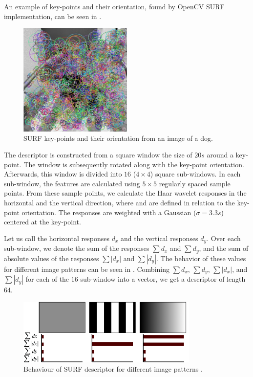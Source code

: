 An example of key-points and their orientation, found by OpenCV SURF implementation, can be seen in .
\begin{figure}[ht!]
    \centering
    \includegraphics[width=0.50\textwidth]{Figures/surf/surf_example.jpg}
    \caption[SURF key-points and their orientation from an image of a dog]{SURF key-points and their orientation from an image of a dog.}
    \label{fig:surf_example}
\end{figure}

The descriptor is constructed from a square window the size of $20s$ around a key-point. The window is subsequently rotated along with the key-point orientation. Afterwards, this window is divided into $16$ ($4\times4$) square sub-windows. In each sub-window, the features are calculated using $5\times5$ regularly spaced sample points. From these sample points, we calculate the Haar wavelet responses in the horizontal and the vertical direction, where  and  are defined in relation to the key-point orientation. The responses are weighted with a Gaussian ($\sigma = 3.3s$) centered at the key-point.

Let us call the horizontal responses $d_x$ and the vertical responses $d_y$. Over each sub-window, we denote the sum of the responses $\sum d_x$ and $\sum d_y$, and the sum of absolute values of the responses $\sum |d_x|$ and $\sum |d_y|$. The behavior of these values for different image patterns can be seen in . Combining $\sum d_x$, $\sum d_y$, $\sum |d_x|$, and $\sum |d_y|$ for each of the $16$ sub-window into a vector, we get a descriptor of length $64$.

\begin{figure}
    \centering
    \includegraphics[width=0.8\textwidth]{Figures/surf/surf_descriptor.png}
    \caption[Behaviour of SURF descriptor for different image patterns]{Behaviour of SURF descriptor for different image patterns \cite{Bay2006}.}
    \label{fig:surf_descriptor}
\end{figure}
